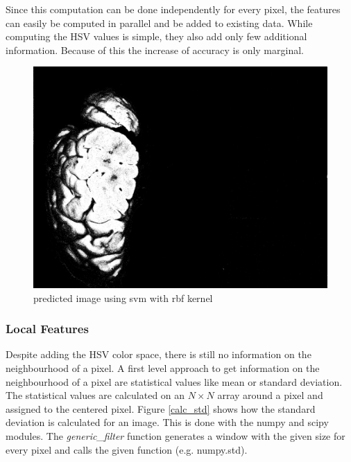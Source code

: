 Since this computation can be done independently for every pixel,
the features can easily be computed in parallel and be added to existing
data. While computing the HSV values is simple, they also add only
few additional information. Because of this the increase of accuracy
is only marginal.

\begin{figure} 
\centering 
\includegraphics[width=0.7\linewidth]{graphics/predict200_svm_rbf} 
\caption{predicted image using svm with rbf kernel} 
\label{fig:predict200_svm_rbf} 
\end{figure}


\subsubsection{Local Features}

Despite adding the HSV color space, there is still no information
on the neighbourhood of a pixel. A first level approach to get information
on the neighbourhood of a pixel are statistical values like mean or
standard deviation. The statistical values are calculated on an $N\times N$
array around a pixel and assigned to the centered pixel. Figure \ref{calc_std}
shows how the standard deviation is calculated for an image. This
is done with the numpy and scipy modules. The \emph{generic\_filter}
function generates a window with the given size for every pixel and
calls the given function (e.g. numpy.std). 

